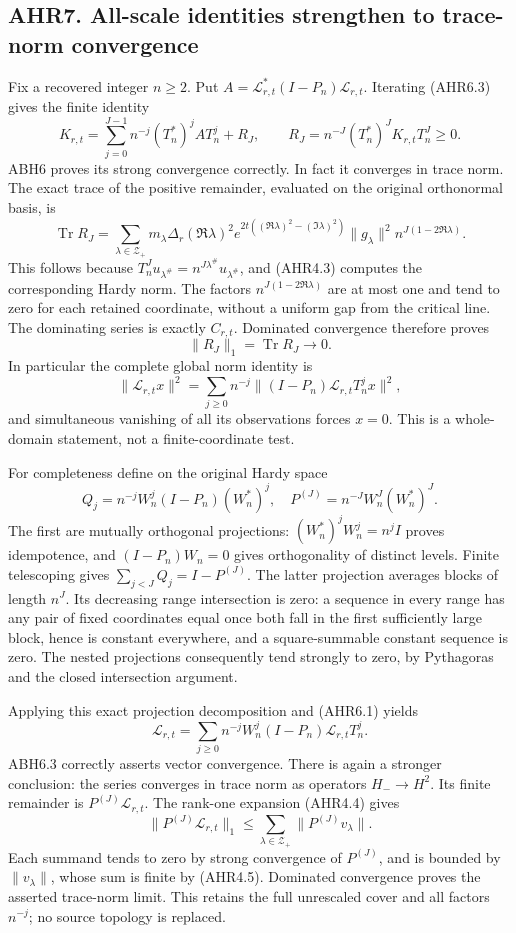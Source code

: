 \subsection{AHR7. All-scale identities strengthen to trace-norm
convergence}\label{ahr7.-all-scale-identities-strengthen-to-trace-norm-convergence}

Fix a recovered integer \(n\ge2\). Put
\(A=\mathcal L_{r,t}^*(I-P_n)\mathcal L_{r,t}\). Iterating (AHR6.3)
gives the finite identity \[
K_{r,t}=\sum_{j=0}^{J-1}n^{-j}(T_n^*)^jAT_n^j+R_J,
\qquad R_J=n^{-J}(T_n^*)^JK_{r,t}T_n^J\ge0.
\tag{AHR7.1}
\] ABH6 proves its strong convergence correctly. In fact it converges in
trace norm. The exact trace of the positive remainder, evaluated on the
original orthonormal basis, is \[
\operatorname{Tr}R_J=
\sum_{\lambda\in\mathscr Z_+}
m_\lambda\Delta_r(\Re\lambda)^2
e^{2t((\Re\lambda)^2-(\Im\lambda)^2)}\|g_\lambda\|^2
n^{J(1-2\Re\lambda)}.
\tag{AHR7.2}
\] This follows because
\(T_n^Ju_{\lambda^\#}=n^{J\lambda^\#}u_{\lambda^\#}\), and (AHR4.3)
computes the corresponding Hardy norm. The factors
\(n^{J(1-2\Re\lambda)}\) are at most one and tend to zero for each
retained coordinate, without a uniform gap from the critical line. The
dominating series is exactly \(C_{r,t}\). Dominated convergence
therefore proves \[
\|R_J\|_1=\operatorname{Tr}R_J\longrightarrow0.
\tag{AHR7.3}
\] In particular the complete global norm identity is \[
\|\mathcal L_{r,t}x\|^2
=\sum_{j\ge0}n^{-j}\|(I-P_n)\mathcal L_{r,t}T_n^jx\|^2,
\tag{AHR7.4}
\] and simultaneous vanishing of all its observations forces \(x=0\).
This is a whole-domain statement, not a finite-coordinate test.

For completeness define on the original Hardy space \[
Q_j=n^{-j}W_n^j(I-P_n)(W_n^*)^j,
\quad P^{(J)}=n^{-J}W_n^J(W_n^*)^J.
\tag{AHR7.5}
\] The first are mutually orthogonal projections:
\((W_n^*)^jW_n^j=n^jI\) proves idempotence, and \((I-P_n)W_n=0\) gives
orthogonality of distinct levels. Finite telescoping gives
\(\sum_{j<J}Q_j=I-P^{(J)}\). The latter projection averages blocks of
length \(n^J\). Its decreasing range intersection is zero: a sequence in
every range has any pair of fixed coordinates equal once both fall in
the first sufficiently large block, hence is constant everywhere, and a
square-summable constant sequence is zero. The nested projections
consequently tend strongly to zero, by Pythagoras and the closed
intersection argument.

Applying this exact projection decomposition and (AHR6.1) yields \[
\mathcal L_{r,t}
=\sum_{j\ge0}n^{-j}W_n^j(I-P_n)\mathcal L_{r,t}T_n^j.
\tag{AHR7.6}
\] ABH6.3 correctly asserts vector convergence. There is again a
stronger conclusion: the series converges in trace norm as operators
\(H_-\to H^2\). Its finite remainder is \(P^{(J)}\mathcal L_{r,t}\). The
rank-one expansion (AHR4.4) gives \[
\|P^{(J)}\mathcal L_{r,t}\|_1
\le\sum_{\lambda\in\mathscr Z_+}\|P^{(J)}v_\lambda\|.
\] Each summand tends to zero by strong convergence of \(P^{(J)}\), and
is bounded by \(\|v_\lambda\|\), whose sum is finite by (AHR4.5).
Dominated convergence proves the asserted trace-norm limit. This retains
the full unrescaled cover and all factors \(n^{-j}\); no source topology
is replaced.

